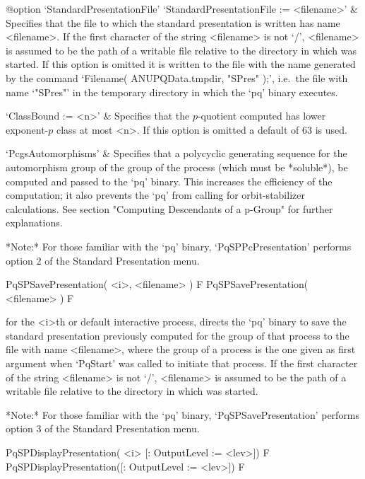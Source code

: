 %
{@option \noexpand`StandardPresentationFile'}
`StandardPresentationFile := <filename>' &
Specifies that the file to which the standard presentation is written has
name <filename>. If the first character of the string <filename>  is  not
`/', <filename> is assumed to be the path of a writable file relative  to
the directory in which {\GAP} was started. If this option is  omitted  it
is written to the file with the name generated by the command  `Filename(
ANUPQData.tmpdir, "SPres" );', i.e.~the file with name `"SPres"'  in  the
temporary directory in which the `pq' binary executes.

`ClassBound := <n>' &
Specifies that the $p$-quotient computed has lower exponent-$p$ class  at
most <n>. If this option is omitted a default of 63 is used.

`PcgsAutomorphisms' &
Specifies that a polycyclic  generating  sequence  for  the  automorphism
group of the group of the process (which must be *soluble*), be  computed
and passed to the `pq' binary.  This  increases  the  efficiency  of  the
computation;  it  also  prevents  the  `pq'  from  calling   {\GAP}   for
orbit-stabilizer calculations. See section "Computing  Descendants  of  a
p-Group" for further explanations.

\enditems

*Note:* For those familiar with  the  `pq'  binary,  `PqSPPcPresentation'
performs option 2 of the Standard Presentation menu.

\>PqSPSavePresentation( <i>, <filename> ) F
\>PqSPSavePresentation( <filename> ) F

for the <i>th or default interactive {\ANUPQ} process, directs  the  `pq'
binary to save the standard  presentation  previously  computed  for  the
group of that process to the file with name <filename>, where  the  group
of a process is the one given as first argument when `PqStart' was called
to initiate that process. If the first character of the string <filename>
is not `/', <filename> is assumed to be  the  path  of  a  writable  file
relative to the directory in which {\GAP} was started.

*Note:* For those familiar with the `pq'  binary,  `PqSPSavePresentation'
performs option 3 of the Standard Presentation menu.

\>PqSPDisplayPresentation( <i> [: OutputLevel := <lev>]) F
\>PqSPDisplayPresentation([: OutputLevel := <lev>]) F

